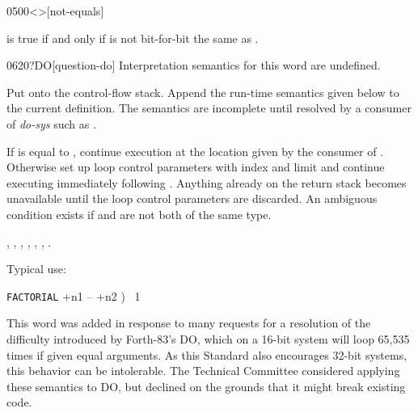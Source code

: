\begin{worddef}[ne]{0500}{<>}[not-equals]
\item {}

	 is true if and only if  is not bit-for-bit
	the same as .
\end{worddef}


\begin{worddef}[qDO]{0620}{?DO}[question-do]
\interpret
	Interpretation semantics for this word are undefined.

\compile

	Put  onto the control-flow stack. Append the
	run-time semantics given below to the current definition. The
	semantics are incomplete until resolved by a consumer of
	\emph{do-sys} such as .

\runtime

	If  is equal to , continue
	execution at the location given by the consumer of
	. Otherwise set up loop control parameters with
	index  and limit  and continue
	executing immediately following . Anything already
	on the return stack becomes unavailable until the loop
	control parameters are discarded. An ambiguous condition
	exists if  and  are not both of
	the same type.

\see {},
	,
	,
	,
	,
	,
	.

	\begin{defer}
	\rationale %
		Typical use:

		\tab \word{:} \texttt{FACTORIAL}  +n1 -- +n2 )~
			1   ~
				 \word{*}~
		\word{;}

		This word was added in response to many requests for a
		resolution of the difficulty introduced by Forth-83's DO,
		which on a 16-bit system will loop 65,535 times if given
		equal arguments. As this Standard also encourages 32-bit
		systems, this behavior can be intolerable. The Technical
		Committee considered applying these semantics to DO, but
		declined on the grounds that it might break existing code.
	\end{defer}
\end{worddef}


